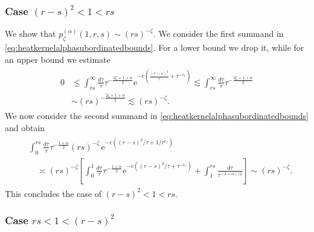 \documentclass[12pt,reqno,a4paper]{amsart}
\theoremstyle{definition}
\theoremstyle{remark}
\numberwithin{equation}{section}
\newcommand{\1}{\mathbbm{1}}
\newcommand{\me}[1]{\mathrm{e}^{#1}}
\begin{document}
\subsubsection{Case $(r-s)^2<1<rs$}

We show that $p_\zeta^{(\alpha)}(1,r,s)\sim(rs)^{-\zeta}$. We consider the first summand in \eqref{eq:heatkernelalphasubordinatedbounds}. For a lower bound we drop it, while for an upper bound we estimate
\begin{align}
  \label{eq:heatkernelalphasubordinatedboundsaux3}
  \begin{split}
    0 & \leq \int_{rs}^\infty \frac{d\tau}{\tau} \tau^{-\frac{2\zeta+1+\alpha}{2}} \me{-c(\frac{(r-s)^2}{\tau}+\tau^{-c_1})}
    \lesssim \int_{rs}^\infty \frac{d\tau}{\tau} \tau^{-\frac{2\zeta+1+\alpha}{2}} \\
      & \sim (rs)^{-\frac{2\zeta+1+\alpha}{2}}  \lesssim (rs)^{-\zeta}.
  \end{split}
\end{align}
We now consider the second summand in \eqref{eq:heatkernelalphasubordinatedbounds} and obtain
\begin{align}
  \label{eq:heatkernelalphasubordinatedboundsaux4}
  \begin{split}
    & \int_{0}^{rs} \frac{d\tau}{\tau} \tau^{-\frac{1+\alpha}{2}} (rs)^{-\zeta}\, \me{-c((r-s)^2/\tau+1/\tau^{c_1})} \\
    & \quad \asymp (rs)^{-\zeta} \left[\int_0^1 \frac{d\tau}{\tau} \tau^{-\frac{1+\alpha}{2}}\me{-c((r-s)^2/\tau+\tau^{-c_1})} + \int_1^{rs} \frac{d\tau}{\tau^{(3+\alpha)/2}}\right]
    \sim (rs)^{-\zeta}.
  \end{split}
\end{align}
This concludes the case of $(r-s)^2<1<rs$.


\subsubsection{Case $rs<1<(r-s)^2$}
\end{document}
